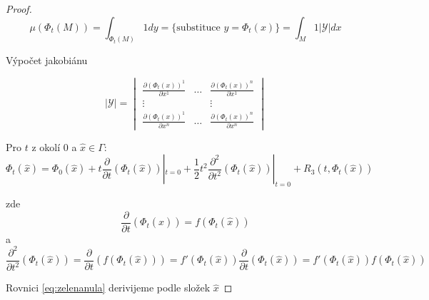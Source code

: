 \documentclass[../main.tex]{subfiles}
\begin{document}
\begin{proof}
    \begin{equation}
        \mu(\Phi_t(M)) = \int_{\Phi_t(M)} 1 dy = \{\text{substituce }y =\Phi_t(x) \} = \int_M 1 |\mathcal{Y}|dx
    \end{equation}

    Výpočet jakobiánu

    \begin{equation}
        |\mathcal{Y}| = 
            \begin{vmatrix}
            \frac{\partial (\Phi_t(x))^1}{\partial x^1} & \dots & \frac{\partial (\Phi_t(x))^n}{\partial x^1} \\
            \vdots                                      &       & \vdots                                      \\
            \frac{\partial (\Phi_t(x))^1}{\partial x^n} & \dots & \frac{\partial (\Phi_t(x))^n}{\partial x^n}
            \end{vmatrix}
    \end{equation}

    Pro $t$ z okolí $0$ a $\hat{x} \in \Gamma$:
    \begin{equation}\label{eq:zelenanula}
        \Phi_t(\hat{x}) = \Phi_0(\hat{x}) + t \frac{\partial}{\partial t } (\Phi_t(\hat{x}))|_{t=0} + \frac{1}{2}t^2 \frac{\partial^2}{\partial t^2} (\Phi_t (\hat{x})) |_{t=0} + R_3(t, \Phi_t(\hat{x}))
    \end{equation} 

    zde
    \begin{equation}
        \frac{\partial}{\partial t }(\Phi_t(\hat{x })) = f(\Phi_t (\hat{x}))
    \end{equation}
    a 
    \begin{equation}
        \frac{\partial^2}{\partial t^2} (\Phi_t (\hat{x})) = \frac{\partial}{\partial t}(f(\Phi_t (\hat{x}))) = f'(\Phi_t (\hat{x})) \frac{\partial}{\partial t} (\Phi_t (\hat{x})) = f'(\Phi_t (\hat{x})) f(\Phi_t (\hat{x}))
    \end{equation}

    Rovnici \eqref{eq:zelenanula} derivijeme podle složek $\hat{x}$

\end{proof}
\end{document}
